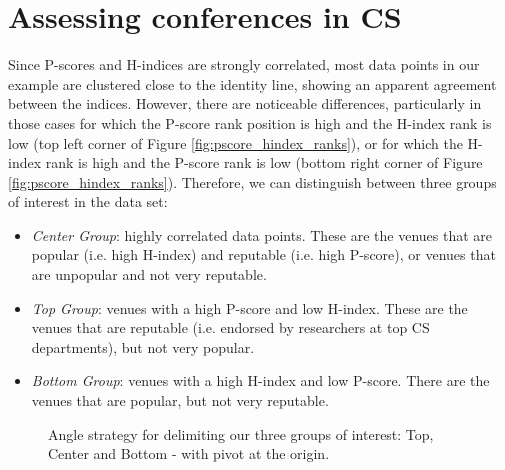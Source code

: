 \documentclass[notitlepage]{svjour3}
\begin{document}
\section{Assessing conferences in CS}
\label{sec:notifications}

Since P-scores and H-indices are strongly correlated, most data points in our example are clustered close to the identity 
line, showing an apparent agreement between the indices. However, there are noticeable differences, 
particularly in those cases for which the P-score rank position is high and the H-index rank is low 
(top left corner of Figure \ref{fig:pscore_hindex_ranks}), or for which the H-index rank is high and the 
P-score rank is low (bottom right corner of Figure \ref{fig:pscore_hindex_ranks}). Therefore, we 
can distinguish between three groups of interest in the data set:

\begin{itemize}
\item \textit{Center Group}: highly correlated data points. These are the venues that are popular (i.e. high H-index) and reputable (i.e. high P-score), or venues that are unpopular and not very reputable.
\item \textit{Top Group}: venues with a high P-score and low H-index. These are the venues that are reputable (i.e. endorsed by researchers at top CS departments), but not very popular.
\item \textit{Bottom Group}: venues with a high H-index and low P-score. There are the venues that are popular, but not very reputable.

\end{itemize}

\begin{figure}[h!]
  \begin{center}
    \caption{Angle strategy for delimiting our three groups of interest: Top, Center and Bottom - with pivot at the origin.}
    \label{fig:angle_strategy}
  \end{center}
\end{figure}
\end{document}
